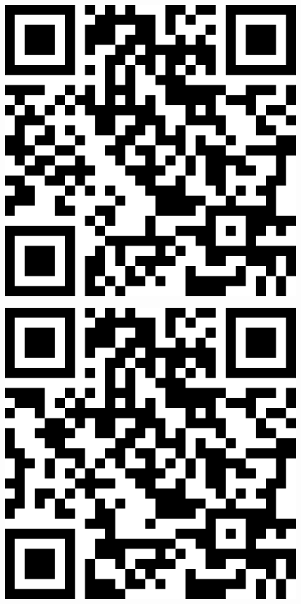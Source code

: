 \documentclass[letterpaper]{article}
\begin{document}
 \endgroup 
 \vspace*{\fill} 
 \pagebreak 
{} 
 \vspace*{\fill} 
 \begingroup 
 \centerline{\includegraphics[scale=1,width=5in,height=5in]{Office3551.png}} 
 \endgroup 
 \vspace*{\fill} 
 \pagebreak 
{} 
 \vspace*{\fill} 
 \begingroup 
 \centerline{\includegraphics[scale=1,width=5in,height=5in]{Office3555.png}} 
\end{document}

